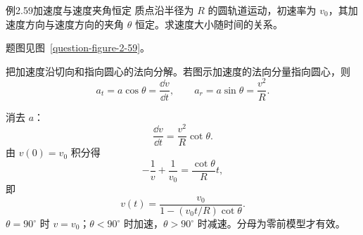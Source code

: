 \ifdefined\Needspace{}\fi
\begin{origexamplebox}{例2.59\quad 加速度与速度夹角恒定}
质点沿半径为 $R$ 的圆轨道运动，初速率为 $v_0$，其加速度方向与速度方向的夹角 $\theta$ 恒定。求速度大小随时间的关系。
\par 题图见图~\ref{question-figure-2-59}。
\KQuestionCH
\end{origexamplebox}
\begin{xesolution}
把加速度沿切向和指向圆心的法向分解。若图示加速度的法向分量指向圆心，则
\[
a_t=a\cos\theta=\frac{\dd v}{\dd t},
\qquad
a_r=a\sin\theta=\frac{v^2}{R}.
\]
\AccelerationVelocityAngleDiagram

消去 $a$：
\[
\frac{\dd v}{\dd t}=\frac{v^2}{R}\cot\theta.
\]
由 $v(0)=v_0$ 积分得
\[
 -\frac1v+\frac1{v_0}=\frac{\cot\theta}{R}t,
\]
即
\[
 \boxed{v(t)=\frac{v_0}{1-(v_0t/R)\cot\theta}}.
\]
$\theta=90^\circ$ 时 $v=v_0$；$\theta<90^\circ$ 时加速，$\theta>90^\circ$ 时减速。分母为零前模型才有效。
\end{xesolution}
